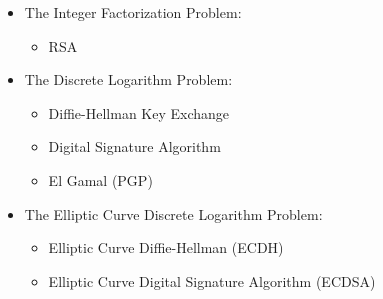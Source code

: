 
\begin{itemize}	
	\item The Integer Factorization Problem: 
	\begin{itemize}	
		\item RSA
	\end{itemize}	
	\item The Discrete Logarithm Problem:
	\begin{itemize}	%
		\item Diffie-Hellman Key Exchange
		\item Digital Signature Algorithm
		\item El Gamal (PGP)
	\end{itemize}	
	\item The Elliptic Curve Discrete Logarithm Problem:
	\begin{itemize}	
		\item Elliptic Curve Diffie-Hellman (ECDH)
		\item Elliptic Curve Digital Signature Algorithm (ECDSA)
	\end{itemize}	
\end{itemize}	
